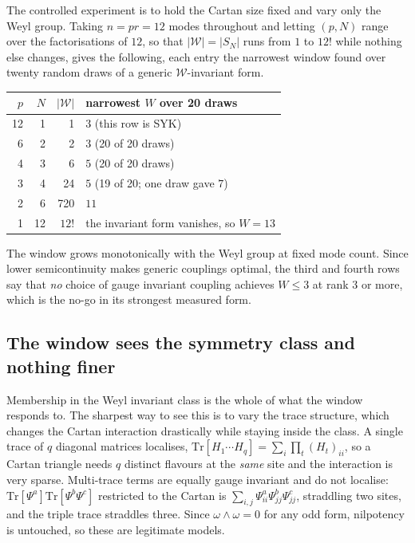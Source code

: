 \documentclass[10pt]{article}
\newcommand{\Tr}{\mathrm{Tr}}
\newcommand{\Wg}{\mathcal{W}}
\begin{document}
The controlled experiment is to hold the Cartan size fixed and vary only the Weyl group. Taking $n=pr=12$ modes
throughout and letting $(p,N)$ range over the factorisations of $12$, so that $|\Wg|=|S_N|$ runs from $1$ to
$12!$ while nothing else changes, gives the following, each entry the narrowest window found over twenty random
draws of a generic $\Wg$-invariant form.

\begin{center}\small
\begin{tabular}{rrrl}
\toprule
$p$ & $N$ & $|\Wg|$ & narrowest $W$ over 20 draws\\
\midrule
12 & 1 & 1 & $3$ \quad(this row is SYK)\\
6 & 2 & 2 & $3$ \quad(20 of 20 draws)\\
4 & 3 & 6 & $5$ \quad(20 of 20 draws)\\
3 & 4 & 24 & $5$ \quad(19 of 20; one draw gave $7$)\\
2 & 6 & 720 & $11$\\
1 & 12 & $12!$ & the invariant form vanishes, so $W=13$\\
\bottomrule
\end{tabular}
\end{center}

The window grows monotonically with the Weyl group at fixed mode count. Since lower semicontinuity makes generic
couplings optimal, the third and fourth rows say that \emph{no} choice of gauge invariant coupling achieves $W\le
3$ at rank $3$ or more, which is the no-go in its strongest measured form.

\subsection{The window sees the symmetry class and nothing finer}

Membership in the Weyl invariant class is the whole of what the window responds to. The sharpest way to see this
is to vary the trace structure, which changes the Cartan interaction drastically while staying inside the class.
A single trace of $q$ diagonal matrices localises, $\Tr[H_1\cdots H_q]=\sum_i\prod_t(H_t)_{ii}$, so a Cartan
triangle needs $q$ distinct flavours at the \emph{same} site and the interaction is very sparse. Multi-trace
terms are equally gauge invariant and do not localise: $\Tr[\Psi^a]\Tr[\Psi^b\Psi^c]$ restricted to the Cartan is
$\sum_{i,j}\Psi^a_{ii}\Psi^b_{jj}\Psi^c_{jj}$, straddling two sites, and the triple trace straddles three. Since
$\omega\wedge\omega=0$ for any odd form, nilpotency is untouched, so these are legitimate models.
\end{document}
